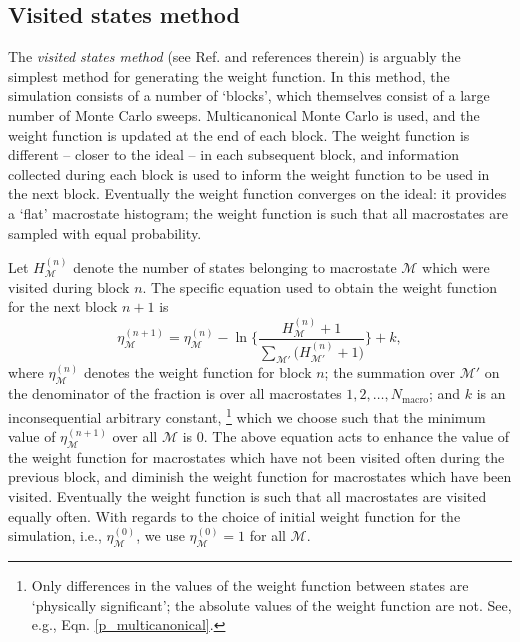 \documentclass{report}
\begin{document}
\subsection{Visited states method}\label{sec:visited_states}
The \emph{visited states method} (see Ref. \cite{Smith_1995} and references therein) is arguably the simplest method for generating the weight function. 
In this method, the simulation consists of a number of
`blocks', which themselves consist of a large number of Monte Carlo sweeps. Multicanonical Monte Carlo is used, and the weight function is updated at
the end of each block. The weight function is different -- closer to the ideal -- in each subsequent block, and information
collected during each block is used to inform the weight function to be used in the next block. Eventually the weight function converges on the 
ideal: it provides a `flat' macrostate histogram; the weight function is such that all macrostates are sampled with equal probability.

Let $H^{(n)}_{\mathcal{M}}$ denote the number of states belonging to macrostate $\mathcal{M}$ which were visited during block $n$.
The specific equation used to obtain the weight function for the next block $n+1$ is
\begin{equation}
\eta^{(n+1)}_{\mathcal{M}}=\eta^{(n)}_{\mathcal{M}}-\ln\Biggl\lbrace
\frac{H^{(n)}_{\mathcal{M}}+1}{\sum_{\mathcal{M}'}\bigl(H^{(n)}_{\mathcal{M}'}+1\bigr)}
\Biggr\rbrace
+k,
\end{equation}
where $\eta^{(n)}_{\mathcal{M}}$ denotes the weight function for block $n$; the summation over $\mathcal{M}'$ on the denominator of the fraction is
over all macrostates $1,2,\dotsc,N_{\text{macro}}$; and $k$ is an inconsequential arbitrary constant,
\footnote{Only differences in the values of the weight function between states are `physically significant'; the absolute values 
of the weight function are not. See, e.g., Eqn. \eqref{p_multicanonical}.}
which we choose such that the minimum value of $\eta^{(n+1)}_{\mathcal{M}}$ over all $\mathcal{M}$ is 0.
The above equation acts to enhance the value of the weight function for macrostates which have not been visited often during the previous block, and
diminish the weight function for macrostates which have been visited. Eventually the weight function is such that all macrostates are visited equally
often. 
With regards to the choice of initial weight function for the simulation, i.e., $\eta^{(0)}_{\mathcal{M}}$, we use $\eta^{(0)}_{\mathcal{M}}=1$
for all $\mathcal{M}$. 
\end{document}
